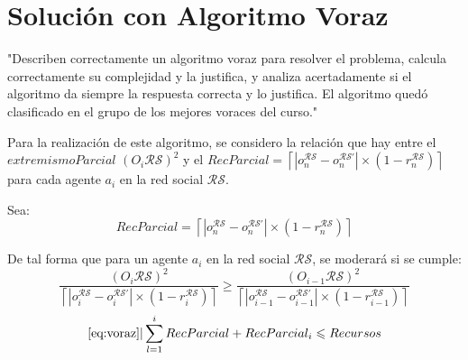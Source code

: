 \documentclass[letterpaper,10pt]{article}
\begin{document}
\section{Solución con Algoritmo Voraz}
\label{sec:algoritmo_voraz}
"Describen correctamente un algoritmo voraz para resolver el problema, calcula correctamente su complejidad y la justifica, y analiza acertadamente si el algoritmo da siempre la respuesta correcta y lo justifica. El algoritmo quedó clasificado en el grupo de los mejores voraces del curso."

Para la realización de este algoritmo, se considero la relación que hay entre el $extremismoParcial$ $(O_i\mathcal{R} \mathcal{S})^2$ y el $RecParcial = \left\lceil  |o_n^{\mathcal{R}\mathcal{S}} - o_n^{\mathcal{R}\mathcal{S}'}| \times (1 - r_n^{\mathcal{R}\mathcal{S}}) \right\rceil$ para cada agente $a_i$ en la red social $\mathcal{R}\mathcal{S}$.

Sea:
\[
  RecParcial = \left\lceil  |o_n^{\mathcal{R}\mathcal{S}} - o_n^{\mathcal{R}\mathcal{S}'}| \times (1 - r_n^{\mathcal{R}\mathcal{S}}) \right\rceil
\]

De tal forma que para un agente $a_i$ en la red social $\mathcal{R}\mathcal{S}$, se moderará si se cumple:
\begin{equation}
  \frac{(O_i\mathcal{R} \mathcal{S})^2}{\left\lceil  |o_i^{\mathcal{R}\mathcal{S}} - o_i^{\mathcal{R}\mathcal{S}'}| \times (1 - r_i^{\mathcal{R}\mathcal{S}}) \right\rceil} \geqslant  \frac{(O_{i-1} \mathcal{R} \mathcal{S})^2}{\left\lceil  |o_{i-1}^{\mathcal{R}\mathcal{S}} - o_{i-1}^{\mathcal{R}\mathcal{S}'}| \times (1 - r_{i-1}^{\mathcal{R}\mathcal{S}}) \right\rceil}
  \label{eq:voraz}
\end{equation}
\begin{equation}
  \eqref{eq:voraz} | \sum_{l=1}^{i}RecParcial + RecParcial_i \leqslant Recursos
  \label{eq:voraz2}
\end{equation}
\end{document}
